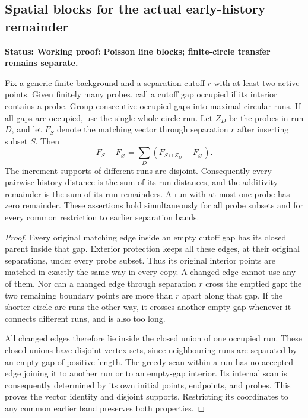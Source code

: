 \documentclass[11pt,letterpaper]{article}
\newcommand{\status}[1]{\textbf{Status: #1.}}
\begin{document}
\subsection{Spatial blocks for the actual early-history remainder}
\label{sec:history-cluster-remainder}

\status{Working proof: Poisson line blocks; finite-circle transfer remains separate}

\begin{lemma}
\label{lem:history-occupied-clusters}
Fix a generic finite background and a separation cutoff $r$
with at least two active points. Given finitely many probes,
call a cutoff gap occupied if its interior contains a probe.
Group consecutive occupied gaps into maximal circular runs.
If all gaps are occupied, use the single whole-circle run.
Let $Z_D$ be the probes in run $D$, and let $F_S$ denote the
matching vector through separation $r$ after inserting subset $S$.
Then
\begin{equation}\label{eq:history-cluster-superposition}
 F_S-F_\varnothing
       =\sum_D(F_{S\cap Z_D}-F_\varnothing).
\end{equation}
The increment supports of different runs are disjoint.
Consequently every pairwise history distance is the sum of
its run distances, and the additivity remainder is the sum of
its run remainders. A run with at most one probe has zero
remainder. These assertions hold simultaneously for all probe
subsets and for every common restriction to earlier separation
bands.
\end{lemma}
\begin{proof}
Every original matching edge inside an empty cutoff gap has
its closed parent inside that gap. Exterior protection keeps
all these edges, at their original separations, under every
probe subset. Thus its original interior points are matched
in exactly the same way in every copy. A changed edge cannot
use any of them. Nor can a changed edge through separation
$r$ cross the emptied gap: the two remaining boundary points
are more than $r$ apart along that gap. If the shorter circle
arc runs the other way, it crosses another empty gap whenever
it connects different runs, and is also too long.

All changed edges therefore lie inside the closed union of
one occupied run. These closed unions have disjoint vertex
sets, since neighbouring runs are separated by an empty gap
of positive length. The greedy scan within a run has no accepted
edge joining it to another run or to an empty-gap interior.
Its internal scan is consequently determined by its own initial
points, endpoints, and probes. This proves the vector identity
and disjoint supports. Restricting its coordinates to any
common earlier band preserves both properties.
\end{proof}
\end{document}
